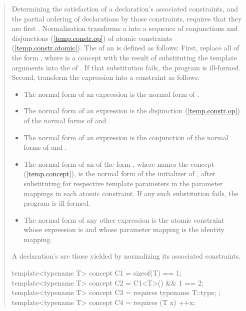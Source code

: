 \begin{quote}
\begin{addedblock}
\pnum
Determining the satisfaction of a declaration's associated constraints,
and the partial ordering of declarations by those constraints,
requires that they are first .
% 
Normalization transforms a  into a sequence of 
conjunctions and disjunctions (\ref{temp.constr.op})
of atomic constraints (\ref{temp.constr.atomic}).
% 
The  of an   is 
defined as follows:
% 
First, replace all  of the form 
, where  is a concept with the 
result of substituting the template arguments  
into the  of .
% 
If that substitution fails, the program is ill-formed.
% 
Second, transform the expression  into a constraint as follows:
\begin{itemize}
\item The normal form of an expression  is the normal form
of .

\item The normal form of an expression  is the  
disjunction (\ref{temp.constr.op}) of the normal forms of  
and .

\item The normal form of an expression  is the  
conjunction of the normal forms of  
and .

\item The normal form of an  of the form
, where  names the concept
 (\ref{temp.concept}),
is the normal form of the initializer of ,
after substituting  for
 respective template parameters in the
parameter mappings in each atomic constraint.
If any such substitution fails, the program is ill-formed.

\item The normal form of any other expression 
is the atomic constraint
whose expression is  and whose parameter mapping is the
identity mapping.
\end{itemize}
% 
A declaration's  are those
yielded by normalizing its associated constraints.
% 
\enterexample
\begin{codeblock}
template<typename T> concept C1 = sizeof(T) == 1;
template<typename T> concept C2 = C1<T>() && 1 == 2;
template<typename T> concept C3 = requires { typename T::type; };
template<typename T> concept C4 = requires (T x) { ++x; }


\end{codeblock}
\end{addedblock}
\end{quote}
